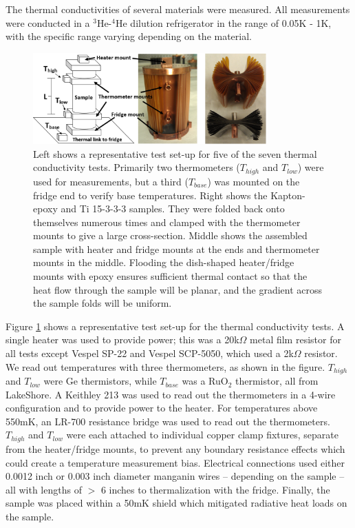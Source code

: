 \documentclass[final]{svjour2}
\begin{document}
The thermal conductivities of several materials were measured. All measurements were conducted in a $^3$He-$^4$He dilution refrigerator in the range of 0.05K - 1K, with the specific range varying depending on the material.

\begin{figure}[h]
\centering
\includegraphics[width = 0.8\textwidth]{Samples2.png}

\caption{{\small Left shows a representative test set-up for five of the seven thermal conductivity tests. Primarily two thermometers ($T_{high}$ and $T_{low}$) were used for measurements, but a third ($T_{base}$) was mounted on the fridge end to verify base temperatures. Right shows the Kapton-epoxy and Ti 15-3-3-3 samples. They were folded back onto themselves numerous times and clamped with the thermometer mounts to give a large cross-section. Middle shows the assembled sample with heater and fridge mounts at the ends and thermometer mounts in the middle. Flooding the dish-shaped heater/fridge mounts with epoxy ensures sufficient thermal contact so that the heat flow through the sample will be planar, and the gradient across the sample folds will be uniform. }}
\label{setup}
\end{figure}

Figure \ref{setup} shows a representative test set-up for the thermal conductivity tests. A single heater was used to provide power; this was a 20k$\Omega$ metal film resistor for all tests except Vespel SP-22 and Vespel SCP-5050, which used a 2k$\Omega$ resistor. We read out temperatures with three thermometers, as shown in the figure. $T_{high}$ and $T_{low}$ were Ge thermistors, while $T_{base}$ was a RuO$_2$ thermistor, all from LakeShore. A Keithley 213 was used to read out the thermometers in a 4-wire configuration and to provide power to the heater. For temperatures above 550mK, an LR-700 resistance bridge was used to read out the thermometers. $T_{high}$ and $T_{low}$ were each attached to individual copper clamp fixtures, separate from the heater/fridge mounts, to prevent any boundary resistance effects which could create a temperature measurement bias. Electrical connections used either 0.0012 inch or 0.003 inch diameter manganin wires -- depending on the sample -- all with lengths of $>$ 6 inches to thermalization with the fridge. Finally, the sample was placed within a 50mK shield which mitigated radiative heat loads on the sample.
\end{document}
